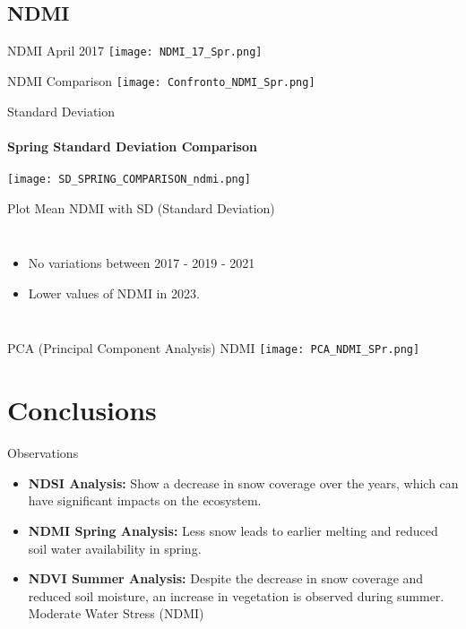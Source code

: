 \documentclass[10pt]{beamer}
\begin{document}
\subsection{NDMI}

\begin{frame}{NDMI April 2017}
    \centering
    \texttt{[image: NDMI\_17\_Spr.png]}  
    
\end{frame}

\begin{frame}{NDMI Comparison}
    \centering
    \texttt{[image: Confronto\_NDMI\_Spr.png]}
\end{frame}

\begin{frame}{Standard Deviation}
\framesubtitle{Spring Standard Deviation Comparison}
    \centering
    \texttt{[image: SD\_SPRING\_COMPARISON\_ndmi.png]}
\end{frame}


\begin{frame}{Plot Mean NDMI with SD (Standard Deviation)}
    \begin{columns}
            \begin{itemize}
                \item<1->No variations between 2017 - 2019 - 2021
                \item<2->Lower values of NDMI in 2023.
            \end{itemize}
    \end{columns}
    
\end{frame}

\begin{frame}{PCA (Principal Component Analysis) NDMI}
    \centering
    \texttt{[image: PCA\_NDMI\_SPr.png]}
\end{frame}

\section{Conclusions}
\begin{frame}{Observations}
    \begin{itemize}
        \item \textbf{NDSI Analysis:} Show a decrease in snow coverage over the years, which can have significant impacts on the ecosystem.
        \item \textbf{NDMI Spring Analysis:} Less snow leads to earlier melting and reduced soil water availability in spring.
        \item \textbf{NDVI Summer Analysis:} Despite the decrease in snow coverage and reduced soil moisture, an increase in vegetation is observed during summer. Moderate Water Stress (NDMI)
    \end{itemize}
\end{frame}
\end{document}

